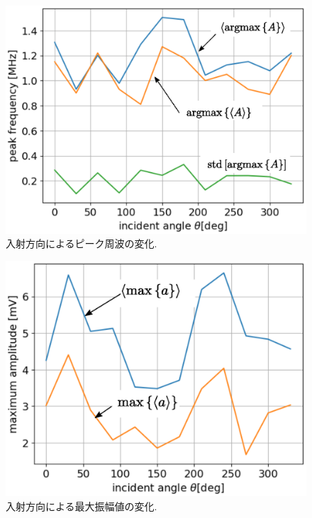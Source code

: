 \begin{figure}[h]
	\begin{center}
	\includegraphics[width=0.8\linewidth]{Figs/fig13.eps} 
	\end{center}
	\caption{
		入射方向によるピーク周波の変化.
	} 
	\label{fig:fig13}
\end{figure}
\begin{figure}[h]
	\begin{center}
	\includegraphics[width=0.8\linewidth]{Figs/fig14.eps} 
	\end{center}
	\caption{
		入射方向による最大振幅値の変化.
	} 
	\label{fig:fig14}
\end{figure}
